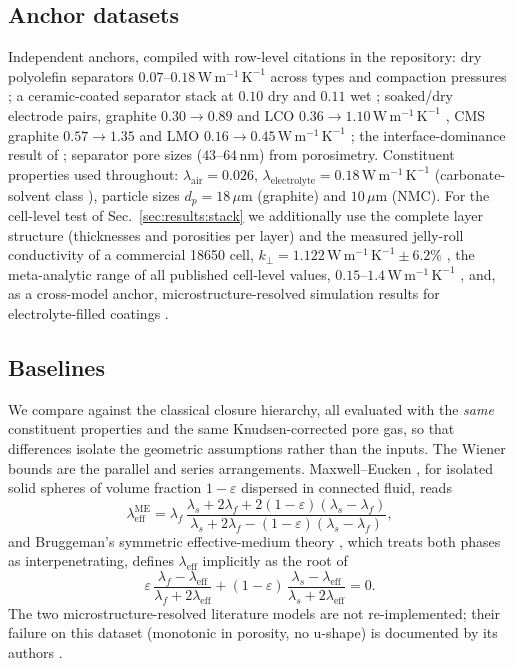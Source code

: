 \documentclass[10pt,a4paper]{article}
\newcommand{\leff}{\lambda_{\mathrm{eff}}}
\newcommand{\lams}{\lambda_{s}}
\newcommand{\lamf}{\lambda_{f}}
\newcommand{\WmK}{\,\mathrm{W\,m^{-1}\,K^{-1}}}
\begin{document}
\subsection{Anchor datasets}
Independent anchors, compiled with row-level citations in the repository: dry polyolefin separators $0.07$--$0.18\WmK$ across types and compaction pressures \cite{richter2017}; a ceramic-coated separator stack at $0.10$ dry and $0.11$ wet \cite{marconnet2018}; soaked/dry electrode pairs, graphite $0.30\to0.89$ and LCO $0.36\to1.10\WmK$ \cite{burheim2013}, CMS graphite $0.57\to1.35$ and LMO $0.16\to0.45\WmK$ \cite{marconnet2018}; the interface-dominance result of \cite{vishwakarma2015}; separator pore sizes ($43$--$64$\,nm) from porosimetry. Constituent properties used throughout: $\lambda_{\mathrm{air}}=0.026$, $\lambda_{\mathrm{electrolyte}}=0.18\WmK$ (carbonate-solvent class \cite{maleki1999}), particle sizes $d_p=18\,\mu$m (graphite) and $10\,\mu$m (NMC). For the cell-level test of Sec.~\ref{sec:results:stack} we additionally use the complete layer structure (thicknesses and porosities per layer) and the measured jelly-roll conductivity of a commercial 18650 cell, $k_\perp = 1.122\WmK \pm 6.2\%$ \cite{steinhardt2021}, the meta-analytic range of all published cell-level values, $0.15$--$1.4\WmK$ \cite{steinhardt2022}, and, as a cross-model anchor, microstructure-resolved simulation results for electrolyte-filled coatings \cite{oehlerdiss}.

\subsection{Baselines}
\label{sec:data:baselines}
We compare against the classical closure hierarchy, all evaluated with the \emph{same} constituent properties and the same Knudsen-corrected pore gas, so that differences isolate the geometric assumptions rather than the inputs. The Wiener bounds \cite{wiener1912} are the parallel and series arrangements. Maxwell--Eucken \cite{maxwell1891,eucken1932}, for isolated solid spheres of volume fraction $1-\varepsilon$ dispersed in connected fluid, reads
\begin{equation}
\leff^{\mathrm{ME}}
=\lamf\,\frac{\lams+2\lamf+2(1-\varepsilon)(\lams-\lamf)}{\lams+2\lamf-(1-\varepsilon)(\lams-\lamf)},
\label{eq:me}
\end{equation}
and Bruggeman's symmetric effective-medium theory \cite{bruggeman1935}, which treats both phases as interpenetrating, defines $\leff$ implicitly as the root of
\begin{equation}
\varepsilon\,\frac{\lamf-\leff}{\lamf+2\leff}
+(1-\varepsilon)\,\frac{\lams-\leff}{\lams+2\leff}=0 .
\label{eq:bruggeman}
\end{equation}
The two microstructure-resolved literature models are not re-implemented; their failure on this dataset (monotonic in porosity, no u-shape) is documented by its authors \cite{gandert2023}.
\end{document}
